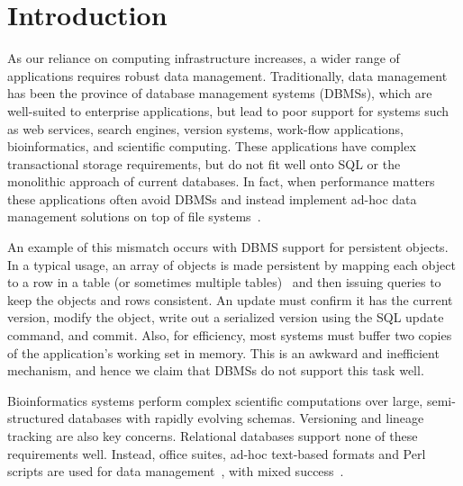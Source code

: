 \documentclass[letterpaper,twocolumn,10pt]{article}
\begin{document}




\section{Introduction}

As our reliance on computing infrastructure increases, a wider range
of applications requires robust data management.  Traditionally, data
management has been the province of database management systems
(DBMSs), which are well-suited to enterprise applications, but lead to
poor support for systems such as web services, search engines, version
systems, work-flow applications, bioinformatics, and
scientific computing.  These applications have complex transactional
storage requirements, but do not fit well onto SQL or the monolithic
approach of current databases.  In fact, when performance matters
these applications often avoid DBMSs and instead implement ad-hoc data
management solutions on top of file systems~\cite{SNS}.

An example of this mismatch occurs with DBMS support for persistent objects.
In a typical usage, an array of objects is made persistent by mapping
each object to a row in a table (or sometimes multiple
tables)~\cite{hibernate} and then issuing queries to keep the objects
and rows consistent. An update must confirm it has the current
version, modify the object, write out a serialized version using the
SQL update command, and commit.  Also, for efficiency, most systems
must buffer two copies of the application's working set in memory.
This is an awkward and inefficient mechanism, and hence we claim that
DBMSs do not support this task well.

Bioinformatics systems perform complex scientific computations over
large, semi-structured databases with rapidly evolving schemas.
Versioning and lineage tracking are also key concerns.  Relational
databases support none of these requirements well.  Instead, office
suites, ad-hoc text-based formats and Perl scripts are used for data
management~\cite{perl}, with mixed success~\cite{excel}.
\end{document}
